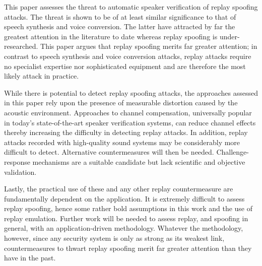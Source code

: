
This paper assesses the threat to automatic speaker verification of replay spoofing attacks.  The threat is shown to be of at least similar significance to that of speech synthesis and voice conversion.  The latter have attracted by far the greatest attention in the literature to date whereas replay spoofing is under-researched.  This paper argues that replay spoofing merits far greater attention; in contrast to speech synthesis and voice conversion attacks, replay attacks require no specialist expertise nor sophisticated equipment and are therefore the most likely attack in practice.  

While there is potential to detect replay spoofing attacks, the approaches assessed in this paper rely upon the presence of measurable distortion caused by the acoustic environment.  Approaches to channel compensation, universally popular in today's state-of-the-art speaker verification systems, can reduce channel effects thereby increasing the difficulty in detecting replay attacks.  In addition, replay attacks recorded with high-quality sound systems may be considerably more difficult to detect.  Alternative countermeasures will then be needed.  Challenge-response mechanisms are a suitable candidate but lack scientific and objective validation.

Lastly, the practical use of these and any other replay countermeasure are fundamentally dependent on the application.  It is extremely difficult to assess replay spoofing, hence some rather bold assumptions in this work and the use of replay emulation.  
Further work will be needed to assess replay, and spoofing in general, with an application-driven methodology.  Whatever the methodology, however, since any security system is only as strong as its weakest link, countermeasures to thwart replay spoofing merit far greater attention than they have in the past.